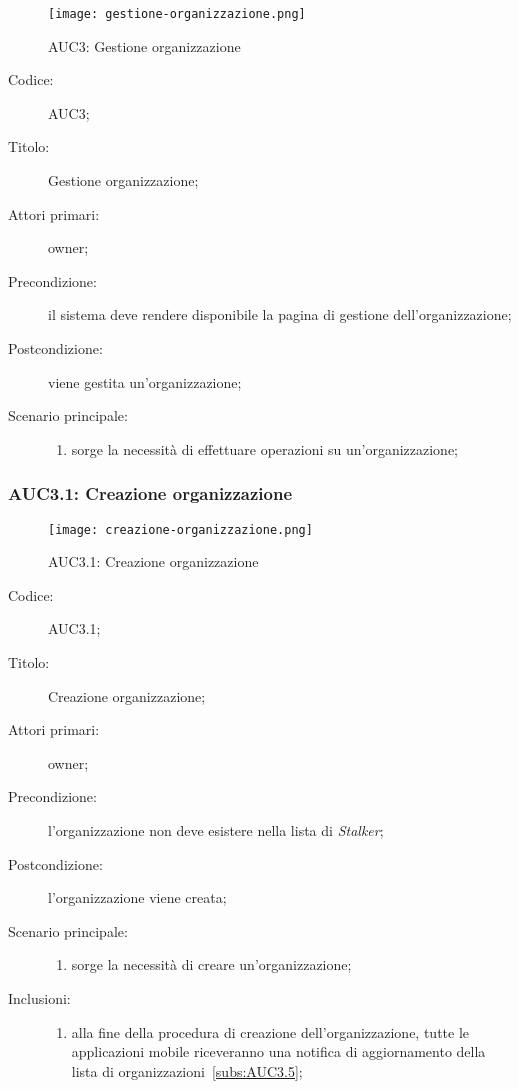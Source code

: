 \documentclass[../../../analisi-dei-requisiti.tex]{subfiles}
\begin{document}
\begin{figure}[H]
  \centering
  \texttt{[image: gestione-organizzazione.png]}
  \caption{AUC3: Gestione organizzazione}%
  \label{fig:AUC3}
\end{figure}

\begin{description}
  \item[Codice:] AUC3;
  \item[Titolo:] Gestione organizzazione;
  \item[Attori primari:] owner;
  \item[Precondizione:] il sistema deve rendere disponibile la pagina di gestione dell'organizzazione;
  \item[Postcondizione:] viene gestita un'organizzazione;
  \item[Scenario principale:]
        \begin{enumerate}
          \item sorge la necessità di effettuare operazioni su un'organizzazione;
        \end{enumerate}
\end{description}

\subsubsection{AUC3.1: Creazione organizzazione}%
\label{subs:AUC3.1}

\begin{figure}[H]
  \centering
  \texttt{[image: creazione-organizzazione.png]}
  \caption{AUC3.1: Creazione organizzazione}%
  \label{fig:AUC3_1}
\end{figure}

\begin{description}
  \item[Codice:] AUC3.1;
  \item[Titolo:] Creazione organizzazione;
  \item[Attori primari:] owner;
  \item[Precondizione:] l'organizzazione non deve esistere nella lista di \emph{Stalker};
  \item[Postcondizione:] l'organizzazione viene creata;
  \item[Scenario principale:]
        \begin{enumerate}
          \item sorge la necessità di creare un'organizzazione;
        \end{enumerate}
  \item[Inclusioni:]
        \begin{enumerate}
          \item alla fine della procedura di creazione dell'organizzazione, tutte le applicazioni mobile riceveranno una notifica di aggiornamento
                della lista di organizzazioni~\ref{subs:AUC3.5};
        \end{enumerate}
\end{description}
\end{document}
